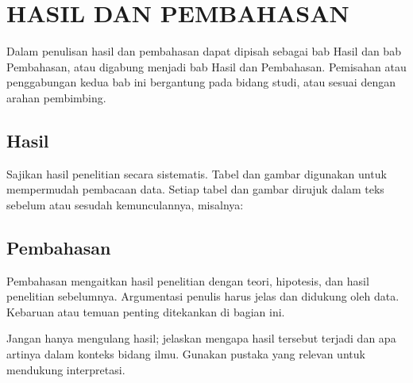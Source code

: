 
\chapter{HASIL DAN PEMBAHASAN}

Dalam penulisan hasil dan pembahasan dapat dipisah sebagai bab Hasil dan bab
Pembahasan, atau digabung menjadi bab Hasil dan Pembahasan.
Pemisahan atau penggabungan kedua bab ini bergantung pada bidang studi,
atau sesuai dengan arahan pembimbing.



\section{Hasil}

Sajikan hasil penelitian secara sistematis.
Tabel dan gambar digunakan untuk mempermudah pembacaan data.
Setiap tabel dan gambar dirujuk dalam teks sebelum atau sesudah kemunculannya,
misalnya:
\section{Pembahasan}

Pembahasan mengaitkan hasil penelitian dengan teori, hipotesis, dan hasil
penelitian sebelumnya.
Argumentasi penulis harus jelas dan didukung oleh data.
Kebaruan atau temuan penting ditekankan di bagian ini.

Jangan hanya mengulang hasil; jelaskan mengapa hasil tersebut terjadi dan
apa artinya dalam konteks bidang ilmu.
Gunakan pustaka yang relevan untuk mendukung interpretasi.
